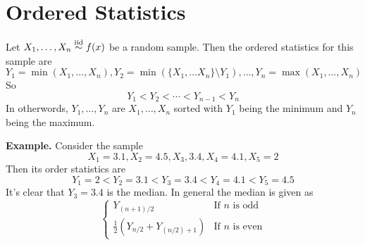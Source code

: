 \documentclass[openany]{report}
\begin{document}
    \section{Ordered Statistics}
     \begin{definition}
        Let $X_1,\ldots, X_n \overset{\mathrm{iid}}{\sim} f(x)$ be a random sample. Then the ordered statistics for this sample are 
        \[Y_1 = \min(X_1, \ldots, X_n), Y_2  = \min\left(\{X_1, \ldots X_n\} \setminus Y_1\right), \ldots, Y_n = \max(X_1,\ldots, X_n)\]
        So 
        \[Y_1 < Y_2 < \cdots < Y_{n-1} < Y_n\]
        In otherwords, $Y_1, \ldots, Y_n$ are $X_1, \ldots, X_n$ sorted with $Y_1$ being the minimum and $Y_n$ being the maximum.
     \end{definition}
     \noindent
     \textbf{Example.} Consider the sample 
     \[X_1 = 3.1, X_2 = 4.5, X_3, 3.4, X_4 = 4.1, X_5 = 2\]
     Then its order statistics are 
     \[Y_1 = 2 < Y_2 = 3.1 < Y_3 = 3.4 < Y_4 = 4.1 < Y_5 = 4.5\]
     It's clear that $Y_3 = 3.4$ is the median. In general the median is given as 
     \[\begin{cases}
        Y_{(n+1)/2} & \text{If $n$ is odd}\\
        \frac{1}{2}\left(Y_{n/2} + Y_{(n/2) + 1}\right) & \text{If $n$ is even}
     \end{cases}\]
\end{document}
